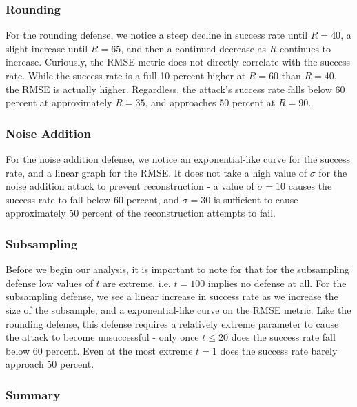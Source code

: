 \documentclass[12pt]{article}
\begin{document}
\subsubsection{Rounding}

\noindent

For the rounding defense, we notice a steep decline in success rate until $R = 40$, a slight increase until $R = 65$, and then a continued decrease as $R$ continues to increase. Curiously, the RMSE metric does not directly correlate with the success rate. While the success rate is a full 10 percent higher at $R = 60$ than $R = 40$, the RMSE is actually higher. Regardless, the attack's success rate falls below 60 percent at approximately $R = 35$, and approaches 50 percent at $R = 90$.

\subsubsection{Noise Addition}

\noindent

For the noise addition defense, we notice an exponential-like curve for the success rate, and a linear graph for the RMSE. It does not take a high value of $\sigma$ for the noise addition attack to prevent reconstruction - a value of $\sigma = 10$ causes the success rate to fall below 60 percent, and $\sigma = 30$ is sufficient to cause approximately 50 percent of the reconstruction attempts to fail.

\subsubsection{Subsampling}

\noindent

Before we begin our analysis, it is important to note for that for the subsampling defense low values of $t$ are extreme, i.e. $t = 100$ implies no defense at all. For the subsampling defense, we see a linear increase in success rate as we increase the size of the subsample, and a exponential-like curve on the RMSE metric. Like the rounding defense, this defense requires a relatively extreme parameter to cause the attack to become unsuccessful - only once $t \leq 20$ does the success rate fall below 60 percent. Even at the most extreme $t = 1$ does the success rate barely approach 50 percent.

\subsubsection{Summary}
\end{document}
